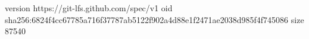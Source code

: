 version https://git-lfs.github.com/spec/v1
oid sha256:6824f4cc67785a716f37787ab5122f902a4d88e1f2471ae2038d985f4f745086
size 87540
